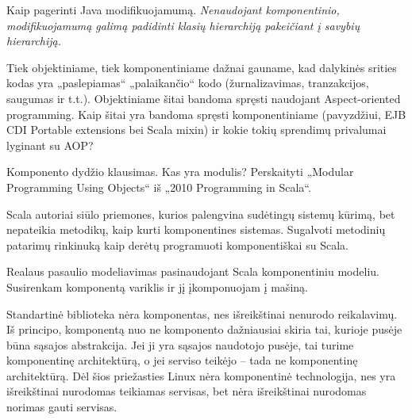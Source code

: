 Kaip pagerinti Java modifikuojamumą. \emph{Nenaudojant komponentinio,
modifikuojamumą galimą padidinti klasių hierarchiją pakeičiant
į savybių hierarchiją.}

Tiek objektiniame, tiek komponentiniame dažnai gauname, kad dalykinės
srities kodas yra „paslepiamas“ „palaikančio“ kodo (žurnalizavimas,
tranzakcijos, saugumas ir t.t.). Objektiniame šitai bandoma spręsti
naudojant Aspect-oriented programming. Kaip šitai yra bandoma
spręsti komponentiniame (pavyzdžiui, EJB CDI Portable extensions
bei Scala mixin) ir kokie tokių sprendimų privalumai lyginant su AOP?

Komponento dydžio klausimas. Kas yra modulis? Perskaityti „Modular
Programming Using Objects“ iš „2010 Programming in Scala“.

Scala autoriai siūlo priemones, kurios palengvina sudėtingų sistemų
kūrimą, bet nepateikia metodikų, kaip kurti komponentines sistemas.
Sugalvoti metodinių patarimų rinkinuką kaip derėtų programuoti
komponentiškai su Scala.

Realaus pasaulio modeliavimas pasinaudojant Scala komponentiniu
modeliu. Susirenkam komponentą variklis ir jį įkomponuojam į
mašiną.

Standartinė biblioteka nėra komponentas, nes išreikštinai nenurodo
reikalavimų. Iš principo, komponentą nuo ne komponento dažniausiai
skiria tai, kurioje pusėje būna sąsajos abstrakcija. Jei ji yra
sąsajos naudotojo pusėje, tai turime komponentinę architektūrą, o
jei serviso teikėjo – tada ne komponentinę architektūrą. Dėl šios
priežasties Linux nėra komponentinė technologija, nes yra
išreikštinai nurodomas teikiamas servisas, bet nėra išreikštinai
nurodomas norimas gauti servisas.
